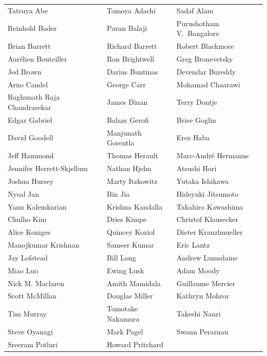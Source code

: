 \begin{center}
\begin{tabular}{lll}
Tatsuya Abe &
Tomoya Adachi &
Sadaf Alam \\
Reinhold Bader &
Pavan Balaji &
Purushotham V.~Bangalore \\
Brian Barrett & 
Richard Barrett&
Robert Blackmore\\
Aur\'elien Bouteiller &
Ron Brightwell& 
Greg Bronevetsky \\ 
Jed Brown &
Darius Buntinas &
Devendar Bureddy \\
Arno Candel &
George Carr &
Mohamad Chaarawi \\
Raghunath Raja Chandrasekar &
James Dinan&
Terry Dontje \\
Edgar Gabriel &
Balazs Gerofi &
Brice Goglin \\
David Goodell&
Manjunath Gorentla &
Erez Haba \\
Jeff Hammond &
Thomas Herault &
Marc-Andr\'e Hermanns \\
Jennifer Herrett-Skjellum &
Nathan Hjelm &
Atsushi Hori \\
Joshua Hursey &
Marty Itzkowitz&
Yutaka Ishikawa\\
Nysal Jan&
Bin Jia&
Hideyuki Jitsumoto \\
Yann Kalemkarian& 
Krishna Kandalla &
Takahiro Kawashima \\
Chulho Kim &
Dries Kimpe &
Christof Klausecker \\
Alice Koniges &
Quincey Koziol &
Dieter Kranzlmueller \\
Manojkumar Krishnan&
Sameer Kumar &
Eric Lantz \\
Jay Lofstead &
Bill Long &
Andrew Lumsdaine \\
Miao Luo &
Ewing Lusk &
Adam Moody \\
Nick M. Maclaren &
Amith Mamidala &
Guillaume Mercier \\
Scott McMillan &
Douglas Miller &
Kathryn Mohror \\
Tim Murray &
Tomotake Nakamura &
Takeshi Nanri \\
Steve Oyanagi &
Mark Pagel &
Swann Perarnau \\
Sreeram Potluri &
Howard Pritchard &

\end{tabular}
\end{center}
